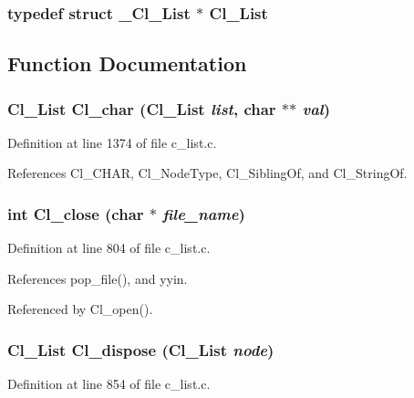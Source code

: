 \subsubsection{\setlength{\rightskip}{0pt plus 5cm}typedef struct \bf{\_\-Cl\_\-List} $\ast$ \bf{Cl\_\-List}}\label{c__list_8h_aa5a1aba613cec42cf6a1b91359a19b6}




\subsection{Function Documentation}
\subsubsection{\setlength{\rightskip}{0pt plus 5cm}\bf{Cl\_\-List} Cl\_\-char (\bf{Cl\_\-List} {\em list}, char $\ast$$\ast$ {\em val})}\label{c__list_8h_6e52ca250e95b2902331d8dd7b07ff84}




Definition at line 1374 of file c\_\-list.c.

References Cl\_\-CHAR, Cl\_\-Node\-Type, Cl\_\-Sibling\-Of, and Cl\_\-String\-Of.
\subsubsection{\setlength{\rightskip}{0pt plus 5cm}int Cl\_\-close (char $\ast$ {\em file\_\-name})}\label{c__list_8h_127e03c017a405bb0423d40c8c5ce98a}




Definition at line 804 of file c\_\-list.c.

References pop\_\-file(), and yyin.

Referenced by Cl\_\-open().
\subsubsection{\setlength{\rightskip}{0pt plus 5cm}\bf{Cl\_\-List} Cl\_\-dispose (\bf{Cl\_\-List} {\em node})}\label{c__list_8h_5c08d5e28cdab2ecae7e94c5333685b0}




Definition at line 854 of file c\_\-list.c.

